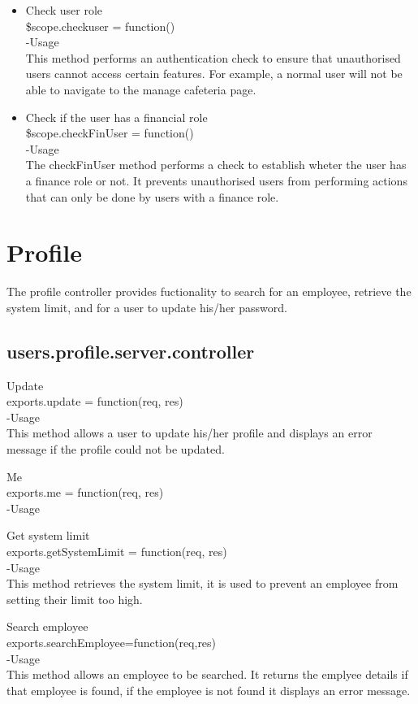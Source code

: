 \documentclass[a4paper,12pt]{article}
\begin{document}
\begin{itemize}
\item Check user role\\
 \$scope.checkuser = function()\\
-Usage\\
This method performs an authentication check to ensure that unauthorised users cannot access certain features. For example, a normal user will not be able to navigate to the manage cafeteria page.

\item Check if the user has a financial role\\
 \$scope.checkFinUser = function()\\
-Usage\\
The checkFinUser method performs a check to establish wheter the user has a finance role or not. It prevents unauthorised users from performing actions that can only be done by users with a finance role.
 \end{itemize}
 \section{Profile}
 The profile controller provides fuctionality to search for an employee, retrieve the system limit, and for a user to update his/her password.
 \subsection{users.profile.server.controller}
 \item Update\\
 exports.update = function(req, res)\\
 -Usage\\
 This method allows a user to update his/her profile and displays an error message if the profile could not be updated.
 \item Me\\
 exports.me = function(req, res)\\
 -Usage\\
 
 \item Get system limit\\
 exports.getSystemLimit = function(req, res)\\
 -Usage\\
 This method retrieves the system limit, it is used to prevent an employee from setting their limit too high.
 \item Search employee\\
 exports.searchEmployee=function(req,res)\\
 -Usage\\
 This method allows an employee to be searched. It returns the emplyee details if that employee is found, if the employee is not found it displays an error message.
 \begin{itemize}
 
 \end{itemize}
\end{document}
